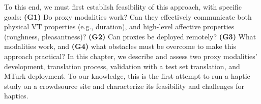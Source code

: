     
    
    To this end, we must first establish  feasibility of this approach, with specific goals: 
    \textbf{(G1)} {Do proxy modalities work?} Can they effectively communicate both physical VT properties (e.g., duration), and high-level affective properties (roughness, pleasantness)? 
      \textbf{(G2)} {Can proxies be deployed remotely?}
      \textbf{(G3)} {What modalities work}, and 
      \textbf{(G4)} {what obstacles must be overcome to make this approach practical?}
      In this chapter, we describe and assess two proxy modalities' development,  translation process, validation with a test set translation, and MTurk deployment.  
      To our knowledge, this is the first attempt to run a haptic study on a crowdsource site and characterize its feasibility and challenges for haptics. 

      
          
